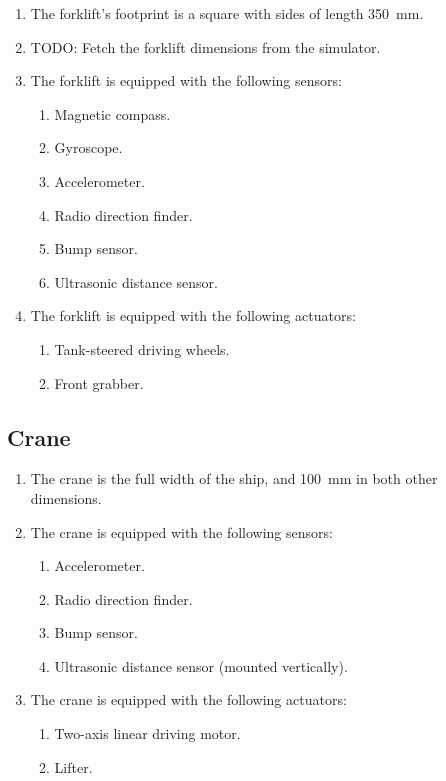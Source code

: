 \begin{enumerate}
  \item The forklift's footprint is a square with sides of length \SI{350}{mm}.
  \item TODO: Fetch the forklift dimensions from the simulator.
  \item The forklift is equipped with the following sensors:
  \begin{enumerate}
    \item Magnetic compass.
    \item Gyroscope.
    \item Accelerometer.
    \item Radio direction finder.
    \item Bump sensor.
    \item Ultrasonic distance sensor.
  \end{enumerate}
  \item The forklift is equipped with the following actuators:
  \begin{enumerate}
    \item Tank-steered driving wheels.
    \item Front grabber.
  \end{enumerate}
\end{enumerate}

\subsection{Crane}
\label{spec:crane}

\begin{enumerate}
  \item The crane is the full width of the ship, and \SI{100}{mm}
        in both other dimensions.
  \item The crane is equipped with the following sensors:
  \begin{enumerate}
    \item Accelerometer.
    \item Radio direction finder.
    \item Bump sensor.
    \item Ultrasonic distance sensor (mounted vertically).
  \end{enumerate}
  \item The crane is equipped with the following actuators:
  \begin{enumerate}
    \item Two-axis linear driving motor.
    \item Lifter.
  \end{enumerate}
\end{enumerate}
